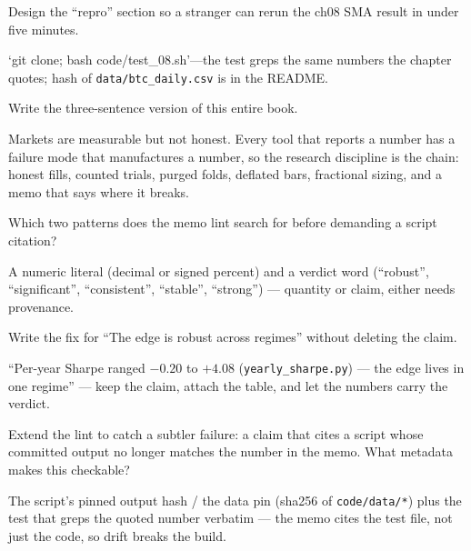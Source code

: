 \begin{exercise}[hard]
Design the ``repro'' section so a stranger can rerun the ch08 SMA result in under five
minutes.
\end{exercise}
\begin{solution}
`git clone; bash code/test\_08.sh'---the test greps the same numbers the chapter quotes;
hash of \texttt{data/btc\_daily.csv} is in the README.
\end{solution}

\begin{exercise}[hard]
Write the three-sentence version of this entire book.
\end{exercise}
\begin{solution}
Markets are measurable but not honest. Every tool that reports a number has a failure
mode that manufactures a number, so the research discipline is the chain: honest fills,
counted trials, purged folds, deflated bars, fractional sizing, and a memo that says
where it breaks.
\end{solution}

\begin{exercise}[easy]
Which two patterns does the memo lint search for before demanding
a script citation?
\end{exercise}
\begin{solution}
A numeric literal (decimal or signed percent) and a verdict word
(``robust'', ``significant'', ``consistent'', ``stable'',
``strong'') --- quantity or claim, either needs provenance.
\end{solution}
\begin{exercise}[medium]
Write the fix for ``The edge is robust across regimes'' without
deleting the claim.
\end{exercise}
\begin{solution}
``Per-year Sharpe ranged $-0.20$ to $+4.08$
(\texttt{yearly\_sharpe.py}) --- the edge lives in one regime''
--- keep the claim, attach the table, and let the numbers carry
the verdict.
\end{solution}
\begin{exercise}[hard]
Extend the lint to catch a subtler failure: a claim that cites a
script whose committed output no longer matches the number in the
memo. What metadata makes this checkable?
\end{exercise}
\begin{solution}
The script's pinned output hash / the data pin (sha256 of
\texttt{code/data/*}) plus the test that greps the quoted number
verbatim --- the memo cites the test file, not just the code, so
drift breaks the build.
\end{solution}

